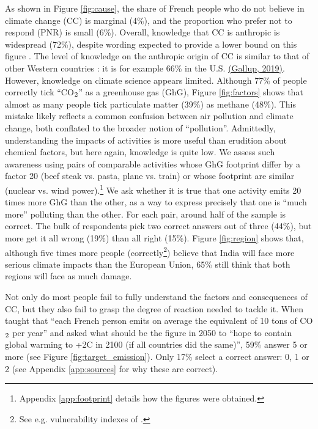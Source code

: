 \documentclass[english,5p,authoryear]{elsarticle}
\begin{document}
As shown in Figure \ref{fig:cause}, the share of French people who do not believe in climate change (CC) is marginal (4\%), and the proportion who prefer not to respond (PNR) is small (6\%). Overall, knowledge that CC is anthropic is widespread (72\%), despite wording expected to provide a lower bound on this figure \citep{motta_experimental_2019}. The level of knowledge on the anthropic origin of CC is similar to that of other Western countries \citep{leiserowitz_international_2007,lee_predictors_2015,stokes_global_2015-1}: it is for example 66\% in the U.S. \hyperlink{https://news.gallup.com/poll/1615/environment.aspx}{(Gallup, 2019)}. However, knowledge on climate science appears limited. Although 77\% of people correctly tick ``CO$_\textnormal{2}$'' as a greenhouse gas (GhG), Figure \ref{fig:factors} shows that almost as many people tick particulate matter (39\%) as methane (48\%). This mistake likely reflects a common confusion between air pollution and climate change, both conflated to the broader notion of ``pollution''. Admittedly, understanding the impacts of activities is more useful than erudition about chemical factors, but here again, knowledge is quite low. We assess such awareness using pairs of comparable activities whose GhG footprint differ by a factor 20 (beef steak vs. pasta, plane vs. train) or whose footprint are similar (nuclear vs. wind power).\footnote{Appendix \ref{app:footprint} details how the figures were obtained.} We ask whether it is true that one activity emits 20 times more GhG than the other, as a way to express precisely that one is ``much more'' polluting than the other. For each pair, around half of the sample is correct. The bulk of respondents pick two correct answers out of three (44\%), but more get it all wrong (19\%) than all right (15\%). Figure \ref{fig:region} shows that, although five times more people (correctly\footnote{See e.g. vulnerability indexes of \citep{climate_vulnerable_forum_climate_2012,guillaumont_measuring_2015,closset_physical_2018}.}) believe that India will face more serious climate impacts than the European Union, 65\% still think that both regions will face as much damage. 

Not only do most people fail to fully understand the factors and consequences of CC, but they also fail to grasp the degree of reaction needed to tackle it. When taught that ``each French person emits on average the equivalent of 10 tons of CO$_\textnormal{2}$ per year'' and asked what should be the figure in 2050 to ``hope to contain global warming to +2\textdegree{}C in 2100 (if all countries did the same)'', 59\% answer 5 or more (see Figure \ref{fig:target_emission}). Only 17\% select a correct answer: 0, 1 or 2 (see Appendix \ref{app:sources} for why these are correct).
\end{document}
